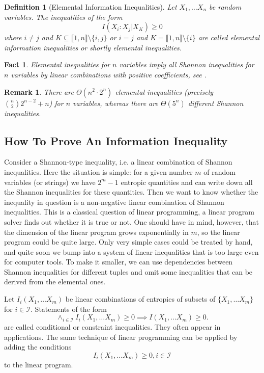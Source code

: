 \documentclass[11pt, a4paper]{kybernetika}
\newtheorem{remark}[theorem]{Remark}
\newtheorem{fact}[theorem]{Fact}
\newtheorem{definition}[theorem]{Definition}
\begin{document}
	\begin{definition}[Elemental Information Inequalities]
		Let $X_1,\ldots X_n$ be random variables. The inequalities of the form $$I(X_i:X_j|X_K)\ge0$$ where $i\neq j$ and $K\subseteq\llbracket1,n\rrbracket\setminus\{i,j\}$ or $i=j$ and $K=\llbracket1,n\rrbracket\setminus\{i\}$ are called \emph{elemental information inequalities} or shortly \emph{elemental inequalities}.
	\end{definition}
	\begin{fact}\label{prop:elem}
		Elemental inequalities for $n$ variables imply all Shannon inequalities for $n$ variables by linear combinations with positive coefficients, see \cite[Chapter~13]{yeung2002first}.
	\end{fact}
	\begin{remark}\label{rem:number-of-inequalities}
		There are $\Theta(n^2\cdot 2^n)$ elemental inequalities (precisely $\binom n22^{n-2}+n$) for $n$ variables,
		whereas there are $\Theta(5^n)$ different Shannon inequalities.
	\end{remark}
	
	\subsection{How To Prove An Information Inequality}
	
	Consider a Shannon-type inequality, i.e. a linear combination of Shannon inequalities. Here the situation is simple: for a given number $m$ of random variables (or strings) we have $2^m-1$ entropic quantities and can write down all the Shannon inequalities for these quantities. Then we want to know whether the inequality in question is a non-negative linear combination of Shannon inequalities. This is a classical question of linear programming, a linear program solver finds out whether it is true or not. One should have in mind, however, that the dimension of the linear program grows exponentially in $m$, so the linear program could be quite large. Only very simple cases could be treated by hand, and quite soon we bump into a system of linear inequalities that is too large even for computer tools. To make it smaller, we can use dependencies between Shannon inequalities for different tuples and omit some inequalities that can be derived from the elemental ones.
	
	Let $I_i(X_1,\ldots X_m)$ be linear combinations of entropies of subsets of $\{X_1,\ldots X_m\}$ for $i\in\mathcal{I}$. Statements of the form
	$$\wedge_{i\in\mathcal{I}}I_i(X_1,\ldots X_m)\ge0\implies I(X_1,\ldots X_m)\ge0.$$
	are called conditional or constraint inequalities. They often appear in applications. The same technique of linear programming can be applied by adding the conditions 
	$$I_i(X_1,\ldots X_m)\ge0,i\in\mathcal{I}$$
	to the linear program.
	
\end{document}
